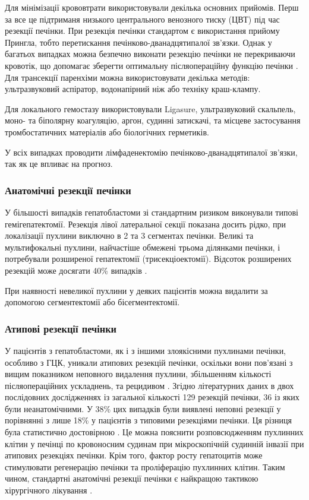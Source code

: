 Для мінімізації крововтрати використовували декілька основних прийомів. Перш за все це підтриманя низького центрального венозного тиску (ЦВТ) під час резекції печінки. При резекція печінки стандартом є використання прийому Прингла, тобто перетискання печінково-дванадцятипалої зв’язки. Однак у багатьох випадках можна безпечно виконати резекцію печінки не перекриваючи кровотік, що допомагає зберегти оптимальну післяопераційну функцію печінки \cite{pmid33210501}. Для трансекції паренхіми можна використовувати декілька методів: ультразвуковий аспіратор, водонапірний ніж або техніку краш-клампу.

Для локального гемостазу використовували Ligasure, ультразвуковий скальпель, моно- та біполярну коагуляцію, аргон, судинні затискачі, та місцеве застосування тромбостатичних матеріалів або біологічних герметиків. 

У всіх випадках проводити лімфаденектомію печінково-дванадцятипалої зв’язки, так як це впливає на прогноз. 

\subsubsection{Анатомічні резекції печінки}
У більшості випадків гепатобластоми зі стандартним ризиком виконували типові гемігепатектомії. Резекція лівої латеральної секції показана досить рідко, при локалізації пухлини виключно в 2 та 3 сегментах печінки. Великі та мультифокальні пухлини, найчастіше обмежені трьома ділянками печінки, і потребували розширеної гепатектомії (трисекціоектомії). Відсоток розширених резекцій може досягати 40\% випадків \cite{pmid33224825}. 

При наявності невеликої пухлини у деяких пацієнтів можна видалити за допомогою сегментектомії або бісегментектомії.
\subsubsection{Атипові резекції печінки}
У пацієнтів з гепатобластоми, як і з іншими злоякісними пухлинами печінки, особливо з ГЦК, уникали атипових резекцій печінки, оскільки вони пов'язані з вищим показником неповного видалення пухлини, збільшенням кількості післяопераційних ускладнень, та рецидивом \cite{pmid33575308}. Згідно літературних даних в двох послідовних дослідженнях із загальної кількості 129 резекцій печінки, 36 із яких були неанатомічними. У 38\% цих випадків були виявлені неповні резекції у порівнянні з лише 18\% у пацієнтів з типовими резекціями печінки. Ця різниця була статистично достовірною \cite{pmid33526266}. Це можна пояснити розповсюдженням пухлинних клітин у печінці по кровоносним судинам при мікроскопічній судинній інвазії при атипових резекціях печінки. Крім того, фактор росту гепатоцитів може стимулювати регенерацію печінки та проліферацію пухлинних клітин. Таким чином, стандартні анатомічні резекції печінки є найкращою тактикою хірургічного лікування \cite{pmid33575308}. 

